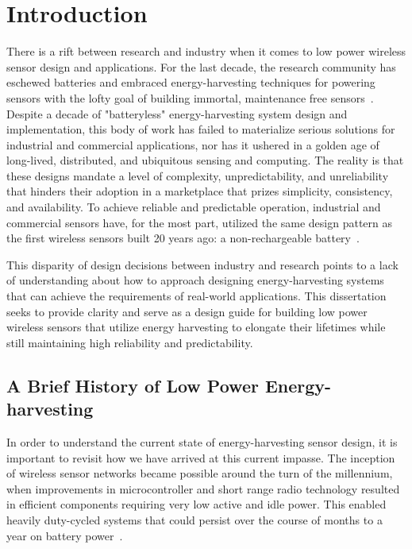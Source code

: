 \chapter{Introduction}
\label{chap:intro}

There is a rift between research and industry when it comes to low power wireless sensor design and applications. 
For the last decade, the research community has eschewed batteries and embraced energy-harvesting techniques for powering sensors with the lofty goal of building immortal, maintenance free sensors~\cite{hester2017future}.
Despite a decade of "batteryless" energy-harvesting system design and implementation, this body of work has failed to materialize serious solutions for industrial and commercial applications, nor has it ushered in a golden age of long-lived, distributed, and ubiquitous sensing and computing.
The reality is that these designs mandate a level of complexity, unpredictability, and unreliability that hinders their adoption in a marketplace that prizes simplicity, consistency, and availability.
To achieve reliable and predictable operation, industrial and commercial sensors have, for the most part, utilized the same design pattern as the first wireless sensors built 20 years ago: a non-rechargeable battery~\cite{polastre2005telos}. 

This disparity of design decisions between industry and research 
points to a lack of understanding about how to approach designing energy-harvesting systems that can achieve the requirements of real-world applications. This dissertation seeks to provide clarity and serve as a design guide for building low power wireless sensors that utilize energy harvesting to elongate their lifetimes while still maintaining high reliability and predictability.

\section{A Brief History of Low Power Energy-harvesting}
In order to understand the current state of energy-harvesting sensor design, it is important to revisit how we have arrived at this current impasse. The inception of wireless sensor networks became possible around the turn of the millennium, when improvements in microcontroller and short range radio technology resulted in efficient components requiring very low active and idle power. This enabled heavily duty-cycled systems that could persist over the course of months to a year on battery power~\cite{polastre2005telos}. 

